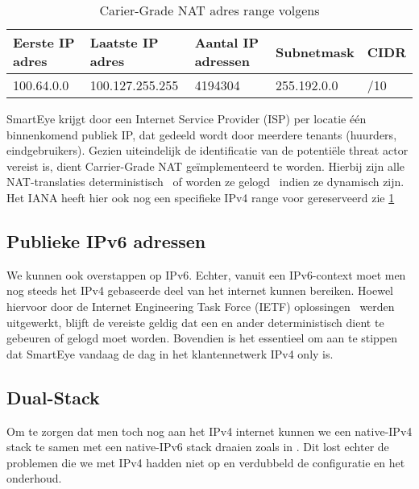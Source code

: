\begin{table}[!htbp]
    \caption{Carier-Grade NAT adres range volgens \textcite{Weil2012}}
    \label{tab:Carrier-GradeNATAdressRanges}
    \begin{tabular}{lllll}
        \hline
        \multicolumn{1}{|l|}{Eerste IP adres} & \multicolumn{1}{l|}{Laatste IP adres} & \multicolumn{1}{l|}{Aantal IP adressen} & \multicolumn{1}{l|}{Subnetmask} & \multicolumn{1}{l|}{CIDR} \\ \hline
        100.64.0.0                            & 100.127.255.255                     & 4194304                                       & 255.192.0.0                   & /10
    \end{tabular}
\end{table}

SmartEye krijgt door een Internet Service Provider (ISP) per locatie één binnenkomend publiek IP, dat gedeeld wordt door meerdere tenants (huurders, eindgebruikers). Gezien uiteindelijk de identificatie van de potentiële threat actor vereist is, dient Carrier-Grade NAT geïmplementeerd te worden. Hierbij zijn alle NAT-translaties deterministisch~\autocite{Donley2014} of worden ze gelogd~\autocite{Perreault2013} indien ze dynamisch zijn. Het IANA heeft hier ook nog een specifieke IPv4 range voor gereserveerd zie \ref{tab:Carrier-GradeNATAdressRanges}

\subsection{Publieke IPv6 adressen}
We kunnen ook overstappen op IPv6. Echter, vanuit een IPv6-context moet men nog steeds het IPv4 gebaseerde deel van het internet kunnen bereiken. Hoewel hiervoor door de Internet Engineering Task Force (IETF) oplossingen~\autocite{Arkko2011} werden uitgewerkt, blijft de vereiste geldig dat een en ander deterministisch dient te gebeuren of gelogd moet worden. Bovendien is het essentieel om aan te stippen dat SmartEye vandaag de dag in het klantennetwerk IPv4 only is.

\subsection{Dual-Stack}
Om te zorgen dat men toch nog aan het IPv4 internet kunnen  we een native-IPv4 stack te samen met een native-IPv6 stack  draaien zoals in \textcite{Gilligan2005}. Dit lost echter de problemen die we met IPv4 hadden niet op en verdubbeld de configuratie en het onderhoud.

